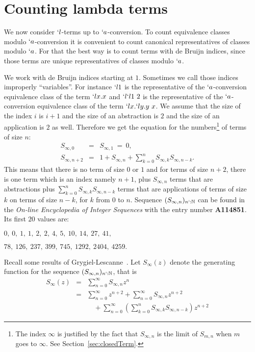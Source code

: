 \documentclass{sig-alternate}
\newcommand{\nat}{\ensuremath{\mathbb{N}}}
\newcommand{\Soo}{\ensuremath{S_{\infty}}}
\begin{document}
\section{Counting lambda terms}
\label{sec:countlbda}

We now consider $`l$-terms up to $`a$-conversion.  To count equivalence classes
modulo $`a$-conversion it is convenient to count canonical representatives of classes
modulo $`a$.  For that the best way is to count terms with de Bruijn indices, since
those terms are unique representatives of classes modulo $`a$.

We work with de Bruijn indices starting at $1$. Sometimes we call those indices
improperly ``variables''.  For instance $`l 1$ is the representative of the
$`a$-conversion equivalence class of the term $`l x.x$ and $`l `l 1~2$ is the
representative of the \mbox{$`a$-conversion} equivalence class of the term $`l x . `l y . y~x$.
We assume that the size of the index $i$ is $i+1$ and the size of an abstraction is
$2$ and the size of an application is $2$ as well.  Therefore we get the equation for
the numbers\footnote{The index $\infty$ is justified by the fact that $S_{\infty,n}$
  is the limit of $S_{m,n}$ when $m$ goes to $\infty$.  See
  Section~\ref{sec:closedTerm}.} of terms of size $n$:
\begin{eqnarray*}
  S_{\infty,0} &=& S_{\infty,1} ~=~ 0,\\
  S_{\infty,n+2} &=& 1 + S_{\infty,n} + \sum_{k=0}^n S_{\infty,k} S_{\infty,n-k}.
\end{eqnarray*}
This means that there is no term of size $0$ or $1$ and for terms of size $n+2$,
there is one term which is an index namely $n+1$, plus $S_{\infty,n}$ terms that are
abstractions plus $\sum_{k=0}^n S_{\infty,k} S_{\infty,n-k}$ terms that are
applications of terms of size $k$ on terms of size $n-k$, for $k$ from $0$ to $n$.
Sequence $(S_{\infty,n})_{n`:\nat}$ can be found in the \emph{On-line Encyclopedia of
  Integer Sequences} with the entry number \textbf{A114851}. Its first $20$ values
are:
\begin{center}
  $0,\ 0,\ 1,\ 1,\ 2,\ 2,\ 4,\ 5,\ 10,\ 14,\ 27,\ 41,$

  $78,\ 126,\ 237,\ 399,\ 745,\ 1292,\ 2404,\ 4259.$
\end{center}
Recall some results of Grygiel-Lescanne~\cite{DBLP:journals/corr/GrygielL14}.  Let $\Soo(z)$
denote the generating function for the sequence $(S_{\infty,n})_{n`:\nat}$, that is
\begin{eqnarray*}
\Soo(z) &=& \sum_{n=0}^{\infty}S_{\infty,n} z^n\\
&=& \sum_{n=0}^{\infty}z^{n+2} + \sum_{n=0}^{\infty} S_{\infty,n} z^{n+2}  \\
&&\quad + \sum_{n=0}^{\infty}\left( \sum_{k=0}^n S_{\infty,k} S_{\infty,n-k}\right)z^{n+2}
\end{eqnarray*}
\end{document}
